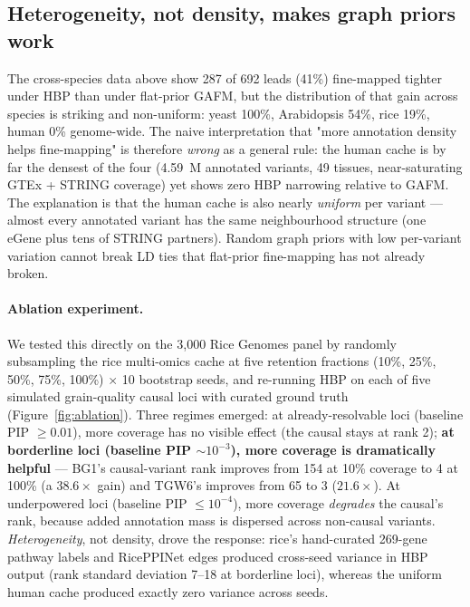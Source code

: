 \subsection*{Heterogeneity, not density, makes graph priors work}
\label{sec:heterogeneity}

The cross-species data above show 287 of 692 leads (41\%)
fine-mapped tighter under HBP than under flat-prior GAFM, but the
distribution of that gain across species is striking and
non-uniform: yeast 100\%, Arabidopsis 54\%, rice 19\%, human 0\%
genome-wide. The naive interpretation that "more annotation density
helps fine-mapping" is therefore \emph{wrong} as a general rule:
the human cache is by far the densest of the four (4.59~M
annotated variants, 49 tissues, near-saturating GTEx + STRING
coverage) yet shows zero HBP narrowing relative to GAFM. The
explanation is that the human cache is also nearly \emph{uniform}
per variant --- almost every annotated variant has the same
neighbourhood structure (one eGene plus tens of STRING partners).
Random graph priors with low per-variant variation cannot break
LD ties that flat-prior fine-mapping has not already broken.

\paragraph{Ablation experiment.} We tested this directly on the
3{,}000 Rice Genomes panel by randomly subsampling the rice
multi-omics cache at five retention fractions (10\%, 25\%, 50\%, 75\%,
100\%) $\times$ 10 bootstrap seeds, and re-running HBP on each of
five simulated grain-quality causal loci with curated ground truth
(Figure~\ref{fig:ablation}). Three regimes emerged: at
already-resolvable loci (baseline PIP $\geq 0.01$), more coverage
has no visible effect (the causal stays at rank 2);
\textbf{at borderline loci (baseline PIP $\sim 10^{-3}$), more
coverage is dramatically helpful} --- BG1's causal-variant rank
improves from 154 at 10\% coverage to 4 at 100\% (a $38.6\times$
gain) and TGW6's improves from 65 to 3 ($21.6\times$). At
underpowered loci (baseline PIP $\leq 10^{-4}$), more coverage
\emph{degrades} the causal's rank, because added annotation mass is
dispersed across non-causal variants. \emph{Heterogeneity}, not
density, drove the response: rice's hand-curated 269-gene pathway
labels and RicePPINet edges produced cross-seed variance in HBP
output (rank standard deviation 7--18 at borderline loci),
whereas the uniform human cache produced exactly zero variance
across seeds.

